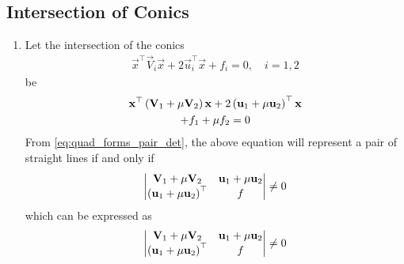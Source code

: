 \documentclass[journal,12pt,twocolumn]{IEEEtran}
\renewcommand\thesection{\arabic{section}}
\renewcommand\thesubsection{\thesection.\arabic{subsection}}
\begin{document}
\subsection{Intersection of Conics}
\renewcommand{\theequation}{\theenumi}
\begin{enumerate}[label=\thesubsection.\arabic*.,ref=\thesubsection.\theenumi]
\item Let the intersection of the conics
\begin{align}
    \label{eq:conic_quad_form_ints}
    \vec{x}^{\top}\vec{V}_i\vec{x}+2\vec{u}_i^{\top}\vec{x}+f_i=0, \quad i = 1,2
    \end{align}
    be 
\begin{multline}
    \label{eq:conic_quad_form_int}
	\mathbf{x}^{\top}\left(\mathbf{V}_1+ \mu \mathbf{V}_2\right)\mathbf{x}+2\left(\mathbf{u}_1+\mu \mathbf{u}_2\right)^{\top}\mathbf{x}
	\\
	+f_1+\mu f_2=0
    \end{multline}
From \eqref{eq:quad_forms_pair_det}, the above equation will represent a pair of straight lines if and only if 
\begin{align}
\begin{vmatrix}
\mathbf{V}_1+ \mu \mathbf{V}_2&\mathbf{u}_1+\mu\mathbf{u}_2
\\
	\left(\mathbf{u}_1+\mu\mathbf{u}_2\right)^{\top}&f
\end{vmatrix}
\ne  0
\end{align}
which can be expressed as 
\begin{multline}
\begin{vmatrix}
\mathbf{V}_1+ \mu \mathbf{V}_2&\mathbf{u}_1+\mu\mathbf{u}_2
\\
	\left(\mathbf{u}_1+\mu\mathbf{u}_2\right)^{\top}&f
\end{vmatrix}
\ne  0
\end{multline}
\end{enumerate}
\end{document}
